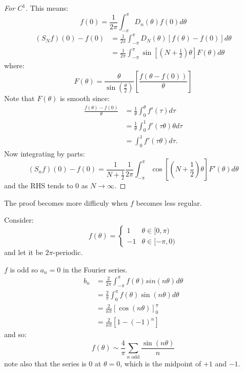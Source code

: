 \documentclass[../Main.tex]{subfiles}
\begin{document}
\begin{proof}[For $C^1$]
    This means:
    \begin{equation*}
        f(0) =\frac{1}{2\pi} \int_{-\pi}^\pi D_n(\theta) f(0) d\theta
    \end{equation*}
    \begin{align*}
        (S_N f)(0) - f(0) &= \frac{1}{2\pi} \int_{-\pi}^\pi D_N(\theta) \left[f(\theta) - f(0)\right]d\theta \\
        &= \frac{1}{2\pi} \int_{-\pi}^\pi \sin\left[\left(N + \frac12\right)\theta\right] F(\theta) d\theta
    \end{align*}
    where:
    \begin{equation*}
        F(\theta) = \frac{\theta}{\sin\left(\frac{\theta}{2}\right)} \left[\frac{f(\theta - f(0))}{\theta}\right]
    \end{equation*}
    Note that $F(\theta)$ is smooth since:
    \begin{align*}
        \frac{f(\theta) - f(0)}{\theta}&= \frac{1}{\theta} \int_{0}^{\theta} f'(\tau) d\tau \\
        &= \frac{1}{\theta} \int_0^1 f'(\tau\theta) \theta d\tau \\
        &= \int_0^1 f'(\tau\theta) d\tau.
    \end{align*}
    Now integrating by parts:
    \begin{equation}
        (S_n f)(0) - f(0) = \frac{1}{N + \frac12} \frac{1}{2\pi} \int_{-\pi}^\pi \cos\left[\left(N + \frac12\right)\theta\right] F'(\theta) d\theta
        \label{eqnFourierPointwiseResult}
    \end{equation}
    and the RHS tends to $0$ as $N \to \infty$.
\end{proof}
\begin{remark}
    The proof becomes more difficuly when $f$ becomes less regular.
\end{remark}
\begin{example}
    Consider:
    \begin{equation*}
        f(\theta) =
        \begin{cases}
            1 & \theta \in [0, \pi) \\
            -1 & \theta \in [-\pi, 0)
        \end{cases}
    \end{equation*}
    and let it be $2\pi$-periodic.

    $f$ is odd so $a_n = 0$ in the Fourier series.
    \begin{align*}
        b_n&= \frac{2}{2\pi} \int_{-\pi}^\pi f(\theta) sin(n\theta) d\theta \\
        &= \frac{2}{\pi}\int_{0}^{\pi} f(\theta)\sin(n\theta) d\theta \\
        &= \frac{2}{n\pi} \left[\cos(n\theta)\right]_0^\pi \\
        &= \frac{2}{n\pi} \left[1 - (-1)^n\right]
    \end{align*}
    and so:
    \begin{equation*}
        f(\theta) \sim \frac{4}{\pi} \sum_{n \text{ odd}} \frac{\sin(n\theta)}{n}
    \end{equation*}
    note also that the series is $0$ at $\theta = 0$, which is the midpoint of $+1$ and $-1$.
\end{example}
\end{document}

